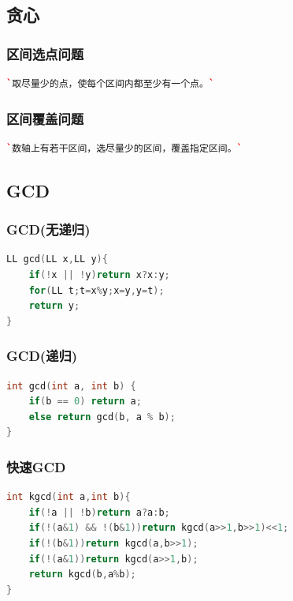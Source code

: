 \documentclass[a4paper]{article}
\begin{document}
\begin{CJK*}{UTF8}{gbsn}
\begin{multicols}{3}
\begin{flushleft}
\subsection{贪心}

\subsubsection{区间选点问题}
\begin{lstlisting}[language={c++}]
`取尽量少的点，使每个区间内都至少有一个点。`
\end{lstlisting}

\subsubsection{区间覆盖问题}
\begin{lstlisting}[language={c++}]
`数轴上有若干区间，选尽量少的区间，覆盖指定区间。`
\end{lstlisting}



\subsection{GCD}


\subsubsection{GCD(无递归)}
\begin{lstlisting}[language={c++}]
LL gcd(LL x,LL y){
	if(!x || !y)return x?x:y;
	for(LL t;t=x%y;x=y,y=t);
	return y;
}
\end{lstlisting}



\subsubsection{GCD(递归)}
\begin{lstlisting}[language={c++}]
int gcd(int a, int b) {
	if(b == 0) return a;
	else return gcd(b, a % b);
}
\end{lstlisting}

\subsubsection{快速GCD}
\begin{lstlisting}[language={c++}]
int kgcd(int a,int b){
	if(!a || !b)return a?a:b;
	if(!(a&1) && !(b&1))return kgcd(a>>1,b>>1)<<1;
	if(!(b&1))return kgcd(a,b>>1);
	if(!(a&1))return kgcd(a>>1,b);
	return kgcd(b,a%b);
}
\end{lstlisting}


\end{flushleft}
\end{multicols}
\end{CJK*}
\end{document}
